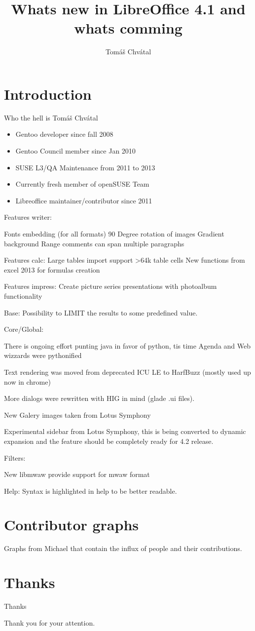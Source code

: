 \documentclass{beamer}
\author{Tom\'{a}\v{s} Chv\'{a}tal\newline {\small openSUSE Team}}
\title{Whats new in LibreOffice 4.1 and whats comming}
\begin{document}
\begin{frame}[t,plain]
\titlepage
\end{frame}

\section{Introduction}

\begin{frame}{Who the hell is Tomáš Chvátal}
	\begin{itemize}
	\item Gentoo developer since fall 2008
	\item Gentoo Council member since Jan 2010
	\item SUSE L3/QA Maintenance from 2011 to 2013
	\item Currently fresh member of openSUSE Team
	\item Libreoffice maintainer/contributor since 2011
	\end{itemize}
\end{frame}

Features writer:

Fonts embedding (for all formats)
90 Degree rotation of images
Gradient background
Range comments can span multiple paragraphs

Features calc:
Large tables import support >64k table cells
New functions from excel 2013 for formulas creation

Features impress:
Create picture series presentations with photoalbum functionality

Base:
Possibility to LIMIT the results to some predefined value.

Core/Global:

There is ongoing effort punting java in favor of python, tis time Agenda and Web wizzards were pythonified

Text rendering was moved from deprecated ICU LE to HarfBuzz (mostly used up now in chrome)

More dialogs were rewritten with HIG in mind (glade .ui files).

New Galery images taken from Lotus Symphony

Experimental sidebar from Lotus Symphony, this is being converted to dynamic expansion and the feature should be completely ready for 4.2 release.

Filters:

New libmwaw provide support for mwaw format

Help:
Syntax is highlighted in help to be better readable.

\section{Contributor graphs}

Graphs from Michael that contain the influx of people and their contributions.

\section{Thanks}

\begin{frame}{Thanks}
	\begin{center}
	Thank you for your attention.
	\end{center}
\end{frame}
\end{document}
